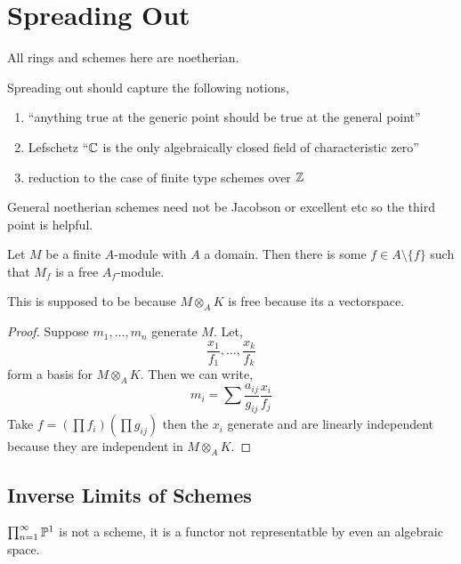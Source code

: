 \documentclass[12pt]{article}
\begin{document}
\section{Spreading Out}

\begin{rmk}
All rings and schemes here are noetherian. 
\end{rmk}

\begin{rmk}
Spreading out should capture the following notions,
\begin{enumerate}
\item ``anything true at the generic point should be true at the general point''
\item Lefschetz ``$\CC$ is the only algebraically closed field of characteristic zero''
\item  reduction to the case of finite type schemes over $\Z$
\end{enumerate}
\end{rmk}

\begin{rmk}
General noetherian schemes need not be Jacobson or excellent etc so the third point is helpful.
\end{rmk}

\begin{prop}
Let $M$ be a finite $A$-module with $A$ a domain. Then there is some $f \in A \setminus \{ f \}$ such that $M_f$ is a free $A_f$-module.
\end{prop}

\begin{rmk}
This is supposed to be because $M \otimes_A K$ is free because its a vectorspace.
\end{rmk}

\begin{proof}
Suppose $m_1, \dots, m_n$ generate $M$. Let,
\[ \frac{x_1}{f_1}, \dots, \frac{x_k}{f_k} \]
form a basis for $M \otimes_A K$. Then we can write,
\[ m_i = \sum \frac{a_{ij}}{g_{ij}} \frac{x_i}{f_j} \]
Take $f = \left( \prod f_i \right) \left( \prod g_{ij} \right)$ then the $x_i$ generate and are linearly independent because they are independent in $M \otimes_A K$.
\end{proof}

\subsection{Inverse Limits of Schemes}

\begin{example}
$\prod^\infty_{n = 1} \P^1$ is not a scheme, it is a functor not representatble by even an algebraic space.
\end{example}
\end{document}
